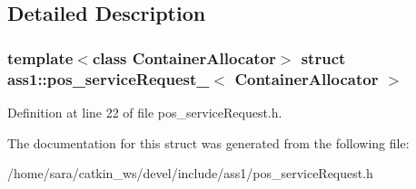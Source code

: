 \subsection{Detailed Description}
\subsubsection*{template$<$class Container\+Allocator$>$\newline
struct ass1\+::pos\+\_\+service\+Request\+\_\+$<$ Container\+Allocator $>$}



Definition at line 22 of file pos\+\_\+service\+Request.\+h.



The documentation for this struct was generated from the following file\+:\begin{DoxyCompactItemize}
\item 
/home/sara/catkin\+\_\+ws/devel/include/ass1/pos\+\_\+service\+Request.\+h\end{DoxyCompactItemize}
